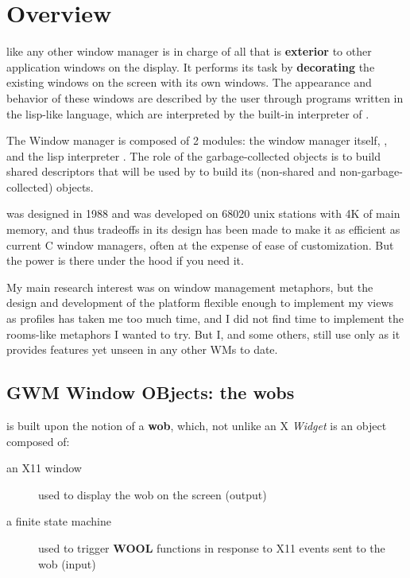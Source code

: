 \chapter{Overview}

\sloppy

{\GWM} like any other window manager is in charge of all that is {\bf
exterior} to other application windows on the display. It performs its task
by {\bf decorating} the existing windows on the screen with its own windows.
The appearance and behavior of these windows are described by the user through
programs written in the lisp-like {\WOOL} language, which are interpreted by
the built-in {\WOOL} interpreter of {\GWM}.

The {\GWM} Window manager is composed of 2 modules: the window manager itself,
{\GWM}, and the lisp interpreter {\WOOL}. The role of the garbage-collected
{\WOOL} objects is to build shared descriptors that will be used by {\GWM}
to build its (non-shared and non-garbage-collected) objects.

{\GWM} was designed in 1988 and was developed on 68020 unix stations with 4K
of main memory, and thus tradeoffs in its design has been made to make it as
efficient as current C window managers, often at the expense of ease of
customization. But the power is there under the hood if you need it.

My main research interest was on window management metaphors, but the design
and development of the platform flexible enough to implement my views as
{\WOOL} profiles has taken me too much time, and I did not find time to
implement the rooms-like metaphors I wanted to try. But I, and some others,
still use only {\GWM} as it provides features yet unseen in any other WMs to
date.

\section{GWM Window OBjects: the wobs}

{\GWM} is built upon the notion of a {\bf wob}, which, not unlike an X {\sl
Widget\/} is an object composed of:

\begin{description} 

\item[an X11 window] used to display the wob on the screen (output)

\item[a {\WOOL} finite state machine] used to trigger {\bf WOOL}
functions in response to X11 events sent to the wob (input)

\end{description}

